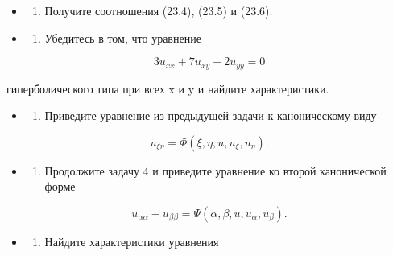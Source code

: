 \documentclass[
  ukrainian,
]{article}
\providecommand{\tightlist}{%
  \setlength{\itemsep}{0pt}\setlength{\parskip}{0pt}}
\begin{document}
\begin{itemize}
\tightlist
\item
  \begin{enumerate}
  \def\labelenumi{\arabic{enumi}.}
  \setcounter{enumi}{1}
  \tightlist
  \item
    Получите соотношения (23.4), (23.5) и (23.6).
  \end{enumerate}
\item
  \begin{enumerate}
  \def\labelenumi{\arabic{enumi}.}
  \setcounter{enumi}{2}
  \tightlist
  \item
    Убедитесь в том, что уравнение
  \end{enumerate}
\end{itemize}

\[
3u_{xx} + 7u_{xy} + 2u_{yy} = 0
\]

гиперболического типа при всех x и y и найдите характеристики.

\begin{itemize}
\tightlist
\item
  \begin{enumerate}
  \def\labelenumi{\arabic{enumi}.}
  \setcounter{enumi}{3}
  \tightlist
  \item
    Приведите уравнение из предыдущей задачи к каноническому виду
  \end{enumerate}
\end{itemize}

\[
u_{\xi\eta} = \Phi(\xi, \eta, u, u_{\xi}, u_{\eta}).
\]

\begin{itemize}
\tightlist
\item
  \begin{enumerate}
  \def\labelenumi{\arabic{enumi}.}
  \setcounter{enumi}{4}
  \tightlist
  \item
    Продолжите задачу 4 и приведите уравнение ко второй канонической
    форме
  \end{enumerate}
\end{itemize}

\[
u_{\alpha\alpha} - u_{\beta\beta} = \Psi(\alpha, \beta, u, u_{\alpha}, u_{\beta}).
\]

\begin{itemize}
\tightlist
\item
  \begin{enumerate}
  \def\labelenumi{\arabic{enumi}.}
  \setcounter{enumi}{5}
  \tightlist
  \item
    Найдите характеристики уравнения
  \end{enumerate}
\end{itemize}
\end{document}
